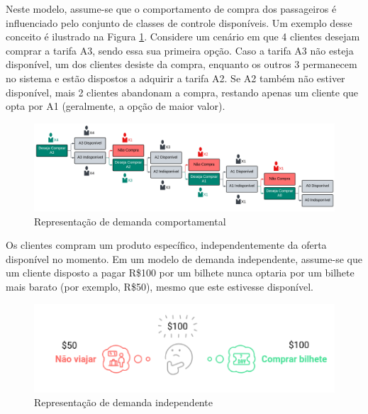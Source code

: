 \begin{description}[style=unboxed, leftmargin=0cm]
	\item[Demanda comportamental:] Neste modelo, assume-se que o comportamento de compra dos passageiros é influenciado pelo conjunto de classes de controle disponíveis. Um exemplo desse conceito é ilustrado na Figura \ref{fig: dc1}. Considere um cenário em que 4 clientes desejam comprar a tarifa A3, sendo essa sua primeira opção. Caso a tarifa A3 não esteja disponível, um dos clientes desiste da compra, enquanto os outros 3 permanecem no sistema e estão dispostos a adquirir a tarifa A2. Se A2 também não estiver disponível, mais 2 clientes abandonam a compra, restando apenas um cliente que opta por A1 (geralmente, a opção de maior valor).

	      \begin{figure}[H]
		      \begin{center}
			      \includegraphics[scale=0.09]{img/dc1.png}
			      \caption{Representação de demanda comportamental}
			      \label{fig: dc1}
		      \end{center}
	      \end{figure}
	      \vspace{-1cm}

	\item[Demanda independente:] Os clientes compram um produto específico, independentemente da oferta disponível no momento. Em um modelo de demanda independente, assume-se que um cliente disposto a pagar R\$100 por um bilhete nunca optaria por um bilhete mais barato (por exemplo, R\$50), mesmo que este estivesse disponível.

	      \begin{figure}[H]
		      \begin{center}
			      \includegraphics[scale=0.7]{img/di1.png}
			      \caption{Representação de demanda independente}
			      \label{fig: di1}
		      \end{center}
	      \end{figure}
	      \vspace{-1cm}


\end{description}
